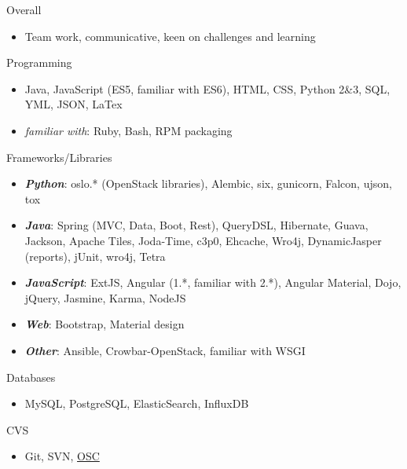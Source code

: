 
\begin{cvskills}

    \cvskill
    {Overall}
    {
      \begin{itemize}[label={}]
        \item Team work, communicative, keen on challenges and learning
      \end{itemize}
    }

    \cvskill
    {Programming}
    {
      \begin{itemize}[label={}]
        \item Java, JavaScript (ES5, familiar with ES6), HTML, CSS, Python 2\&3,
          SQL, YML, JSON, LaTex
        \item \textit{familiar with}: Ruby, Bash, RPM packaging
      \end{itemize}
    }

    \cvskill
    {Frameworks/Libraries}
    {
      \begin{itemize}[label={}]
        \item \textit{\textbf{Python}}: oslo.* (OpenStack libraries), Alembic, six,
          gunicorn, Falcon, ujson, tox
        \item \textit{\textbf{Java}}: Spring (MVC, Data, Boot, Rest), QueryDSL, Hibernate, Guava, \linebreak
          Jackson, Apache Tiles, Joda-Time, c3p0, Ehcache, Wro4j, \linebreak
          DynamicJasper (reports), jUnit, wro4j, Tetra
        \item \textit{\textbf{JavaScript}}: ExtJS, Angular (1.*, familiar with 2.*),
          Angular Material, Dojo, jQuery,\linebreak
          Jasmine, Karma, NodeJS
        \item \textit{\textbf{Web}}: Bootstrap, Material design
        \item \textit{\textbf{Other}}: Ansible, Crowbar-OpenStack, familiar with WSGI
      \end{itemize}
    }

    \cvskill
    {Databases}
    {
      \begin{itemize}[label={}]
        \item MySQL, PostgreSQL, ElasticSearch, InfluxDB
      \end{itemize}
    }

    \cvskill
    {CVS}
    {
      \begin{itemize}[label={}]
        \item Git, SVN, \href{https://github.com/openSUSE/osc}{OSC}
      \end{itemize}
    }


\end{cvskills}
